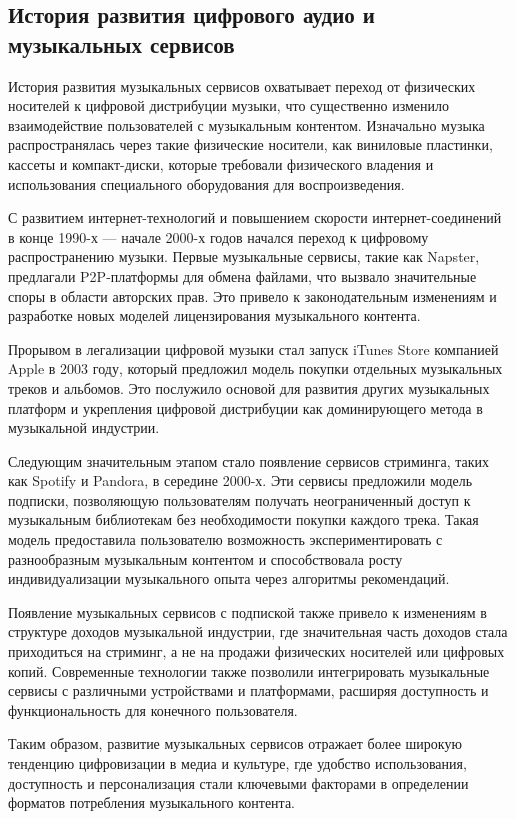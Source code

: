\subsection{История развития цифрового аудио и музыкальных сервисов}

История развития музыкальных сервисов охватывает переход от физических носителей к цифровой дистрибуции музыки, что существенно изменило взаимодействие пользователей с музыкальным контентом. Изначально музыка распространялась через такие физические носители, как виниловые пластинки, кассеты и компакт-диски, которые требовали физического владения и использования специального оборудования для воспроизведения.

С развитием интернет-технологий и повышением скорости интернет-соединений в конце 1990-х — начале 2000-х годов начался переход к цифровому распространению музыки. Первые музыкальные сервисы, такие как Napster, предлагали P2P-платформы для обмена файлами, что вызвало значительные споры в области авторских прав. Это привело к законодательным изменениям и разработке новых моделей лицензирования музыкального контента.

Прорывом в легализации цифровой музыки стал запуск iTunes Store компанией Apple в 2003 году, который предложил модель покупки отдельных музыкальных треков и альбомов. Это послужило основой для развития других музыкальных платформ и укрепления цифровой дистрибуции как доминирующего метода в музыкальной индустрии.

Следующим значительным этапом стало появление сервисов стриминга, таких как Spotify и Pandora, в середине 2000-х. Эти сервисы предложили модель подписки, позволяющую пользователям получать неограниченный доступ к музыкальным библиотекам без необходимости покупки каждого трека. Такая модель предоставила пользователю возможность экспериментировать с разнообразным музыкальным контентом и способствовала росту индивидуализации музыкального опыта через алгоритмы рекомендаций.

Появление музыкальных сервисов с подпиской также привело к изменениям в структуре доходов музыкальной индустрии, где значительная часть доходов стала приходиться на стриминг, а не на продажи физических носителей или цифровых копий. Современные технологии также позволили интегрировать музыкальные сервисы с различными устройствами и платформами, расширяя доступность и функциональность для конечного пользователя.

Таким образом, развитие музыкальных сервисов отражает более широкую тенденцию цифровизации в медиа и культуре, где удобство использования, доступность и персонализация стали ключевыми факторами в определении форматов потребления музыкального контента.

